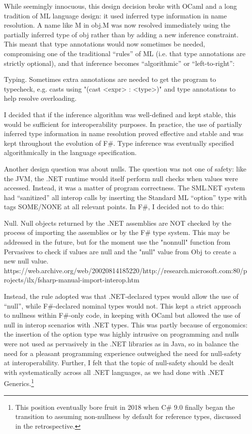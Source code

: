 \documentclass[acmsmall]{acmart}\settopmatter{}
\begin{document}
While seemingly innocuous, this design decision broke with OCaml and a long tradition of ML language design: it used inferred type information in name resolution. A name like M in obj.M was now resolved immediately using the partially inferred type of obj rather than by adding a new inference constraint. This meant that type annotations would now sometimes be needed, compromising one of the traditional “rules” of ML (i.e. that type annotations are strictly optional), and that inference becomes “algorithmic” or “left-to-right”:

\begin{verbquote}
Typing. Sometimes extra annotations are needed to get the program to typecheck, e.g. casts using "(cast <expr> : <type>)" and type annotations to help resolve overloading.
\end{verbquote}

I decided that if the inference algorithm was well-defined and kept stable, this would be sufficient for interoperability purposes. In
practice, the use of partially inferred type information in name resolution proved effective and stable and was kept throughout the
evolution of F\#.  Type inference was eventually specified algorithmically in the language specification. 

Another design question was about nulls. The question was not one of safety: like the JVM, the .NET runtime would itself perform null
checks when values were accessed. Instead, it was a matter of program correctness. The SML.NET system had “sanitized” all interop
calls by inserting the Standard ML “option” type with tags SOME/NONE at all relevant points.  In F\#, I decided not to do this:
\begin{verbquote}
Null.  Null objects returned by the .NET assemblies are NOT checked by the process of importing the assemblies or by the F# type system.  This may be addressed in the future, but for the moment use the "nonnull" function from Pervasives to check if values are null and the "null" value from Obj to create a new null value. https://web.archive.org/web/20020814185220/http://research.microsoft.com:80/projects/ilx/fsharp-manual-import-interop.htm
\end{verbquote}
Instead, the rule adopted was that .NET-declared types would allow the use of “null”, while F\#-declared nominal types would not.  This
kept a strict approach to nullness within F\#-only code, in keeping with OCaml but allowed the use of null in interop scenarios with .NET
types. This was partly because of ergonomics: the insertion of the option type was highly intrusive on programming and nulls were not
used as pervasively in the .NET libraries as in Java, so in balance the need for a pleasant programming experience outweighed the need
for null-safety at interoperability. Further, I felt that the topic of null-safety should be dealt with systematically across all .NET languages, as
we had done with .NET Generics.\footnote{This position eventually bore fruit in 2018 when C\# 9.0 finally began the transition to assuming
non-nullness by default for reference types, discussed in the retrospective.}   
\end{document}

